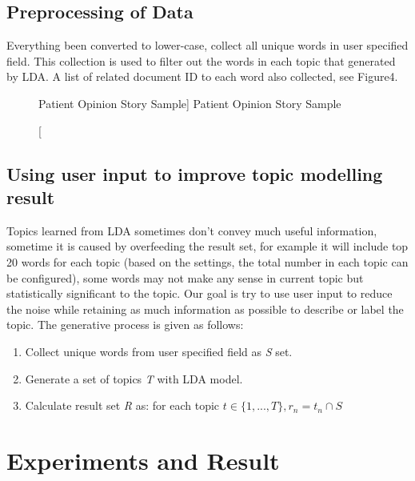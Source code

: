 \documentclass[11pt,twoside]{report}
\begin{document}
\section{Preprocessing of Data}

Everything been converted to lower-case, collect all unique words in user specified field. This collection is used to filter out the words in each topic that generated by LDA. A list of related document ID to each word also collected, see Figure4.

\begin{figure}[tp]
    \begin{center}
    \caption
    [Patient Opinion Story Sample]
    {
    Patient Opinion Story Sample
    \label{Figure4}
    }
    \end{center}
\end{figure}

\section{Using user input to improve topic modelling result}

Topics learned from LDA sometimes don’t convey much useful information, sometime it is caused by overfeeding the result set, for example it will include top 20 words for each topic (based on the settings, the total number in each topic can be configured), some words may not make any sense in current topic but statistically significant to the topic. Our goal  is try to use user input to reduce the noise while retaining as much information as possible to describe or label the topic. The generative process is given as follows: 
\begin{enumerate}
\item Collect unique words from user specified field as \textit{S} set.
\item Generate a set of topics \textit{T} with LDA model.
\item Calculate result set \textit{R} as: for each topic $t\in\{1,...,T\}, r_n = t_n \cap S$
\end{enumerate}

\chapter{Experiments and Result}
\end{document}
